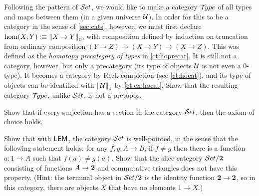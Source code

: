\sectionExercises

\begin{ex}\label{ex:utype-ct}
  Following the pattern of $\mathcal{S}et$, we would like to make a category $\mathcal{T}\!ype$ of all types and maps between them (in a given universe $\mathcal{U}$).  In order for this to be a category in the sense of \cref{sec:cats}, however, we must first declare $\hom(X,Y) \vcentcolon\equiv \mathopen{}\left\Vert X\to Y\right\Vert_{0}\mathclose{}$, with composition defined by induction on truncation from ordinary composition $(Y\to Z) \to (X\to Y) \to (X\to Z)$.  This was defined as the \emph{homotopy precategory of types} in \cref{ct:hoprecat}.  It is still not a category, however, but only a precategory (its type of objects $\mathcal{U}$ is not even a $0$-type).  It becomes a category by Rezk completion
  (see \cref{ct:hocat}), and its type of objects can be identified with $\mathopen{}\left\Vert \mathcal{U}\right\Vert_{1}\mathclose{}$ by \cref{ct:ex:hocat}.  Show that the resulting category $\mathcal{T}\!ype$, unlike $\mathcal{S}et$, is not a pretopos.
\end{ex}

\begin{ex}\label{ex:surjections-have-sections-impl-ac}
  Show that if every surjection has a section in the category $\mathcal{S}et$, then the axiom of choice holds.
\end{ex}

\begin{ex}\label{ex:well-pointed}
  Show that with $\mathsf{LEM}_{}$, the category $\mathcal{S}et$ is well-pointed,
  in the sense that the following statement holds: for any $f, g : A\to B$, if $f \neq g$ then there is a function $a : 1\to A$ such that $f(a) \neq g(a)$.
  Show that the slice category
  $\mathcal{S}et/\mathbf{2}$ consisting of functions $A\to \mathbf{2}$ and commutative triangles does not have this property.
  (Hint: the terminal object in $\mathcal{S}et/\mathbf{2}$ is the identity function $\mathbf{2} \to \mathbf{2}$, so in this category, there are objects $X$ that have no elements $1\to X$.)
\end{ex}

